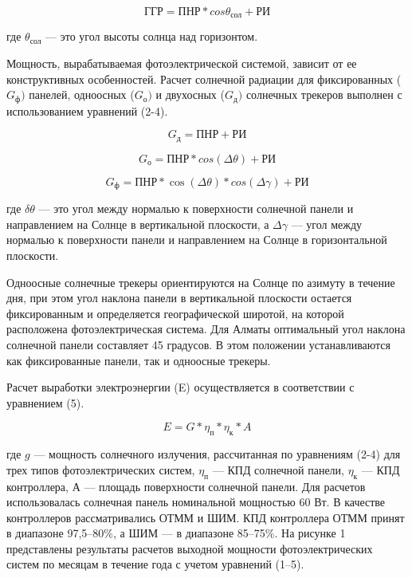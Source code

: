 \begin{multicols}{2}
\begin{equation}
\text{ГГР} = \text{ПНР}*cos\theta_{\text{сол}} + \text{РИ}
\end{equation}

где \(\theta_{\text{сол}}\) --- это угол высоты солнца над горизонтом.

Мощность, вырабатываемая фотоэлектрической системой, зависит от ее
конструктивных особенностей. Расчет солнечной радиации для фиксированных
(\(G_{\text{ф}})\) панелей, одноосных (\(G_{\text{о}})\) и двухосных (\(G_{\text{д}})\)
солнечных трекеров выполнен с использованием уравнений (2-4).

\begin{equation}
G_{\text{д}} = \text{ПНР} + \text{РИ}
\end{equation}

\begin{equation}
G_{\text{о}} = \text{ПНР}*cos(\Delta\theta) + \text{РИ}
\end{equation}

\begin{equation}
G_{\text{ф}} = \text{ПНР}*\cos(\Delta\theta)*cos(\Delta\gamma) + \text{РИ}
\end{equation}

где \(\delta\theta\) --- это угол между нормалью к поверхности
солнечной панели и направлением на Солнце в вертикальной плоскости, а
\(\Delta\gamma\) --- угол между нормалью к поверхности панели и
направлением на Солнце в горизонтальной плоскости.

Одноосные солнечные трекеры ориентируются на Солнце по азимуту в течение
дня, при этом угол наклона панели в вертикальной плоскости остается
фиксированным и определяется географической широтой, на которой
расположена фотоэлектрическая система. Для Алматы оптимальный угол
наклона солнечной панели составляет 45 градусов. В этом положении
устанавливаются как фиксированные панели, так и одноосные трекеры.

Расчет выработки электроэнергии (E) осуществляется в соответствии с
уравнением (5).

\begin{equation}
E = G*\eta_{\text{п}}*\eta_{\text{к}}*A
\end{equation}

где \(g\) --- мощность солнечного излучения, рассчитанная по
уравнениям (2-4) для трех типов фотоэлектрических систем, \(\eta_{\text{п}}\)
--- КПД солнечной панели, \(\eta_{\text{к}}\) --- КПД контроллера, А ---
площадь поверхности солнечной панели. Для расчетов использовалась
солнечная панель номинальной мощностью 60 Вт. В качестве контроллеров
рассматривались ОТММ и ШИМ. КПД контроллера ОТММ принят в диапазоне
97,5--80\%, а ШИМ --- в диапазоне 85--75\%. На рисунке 1 представлены
результаты расчетов выходной мощности фотоэлектрических систем по
месяцам в течение года с учетом уравнений (1--5).
\end{multicols}

